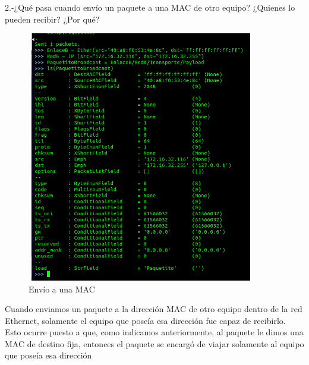 \documentclass{udpreport}
\begin{document}
  	  2.-¿Qué pasa cuando envío un paquete a una MAC de otro equipo? ¿Quienes lo
  	      pueden recibir? ¿Por qué?\\
    		\begin{figure}[H]
  	        	\centering
  	          	\includegraphics[width=10cm, height=11cm]{EnvioPaquetitoMalo2.png}
  	          	\caption{Envío a una MAC}
  		\end{figure}
 	      
 	      Cuando enviamos un paquete a la dirección MAC de otro equipo dentro de la red Ethernet, solamente el equipo que poseía
 	      esa dirección fue capaz de recibirlo. Esto ocurre puesto a que, como indicamos anteriormente, al paquete le dimos una
 	      MAC de destino fija, entonces el paquete se encargó de viajar solamente al equipo que poseía esa dirección\\
 
\end{document}
